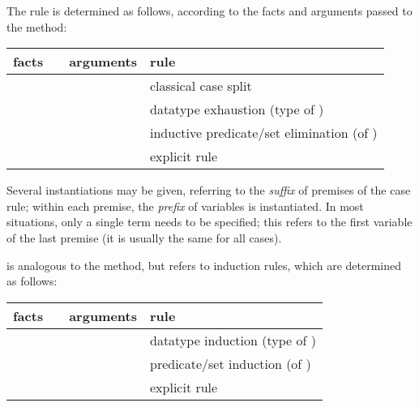\begin{isabellebody}
\begin{isamarkuptext}
\begin{descr}
  The rule is determined as follows, according to the facts and
  arguments passed to the \mbox{} method:

  \medskip
  \begin{tabular}{llll}
    facts           &                 & arguments   & rule \\\hline
                    & \mbox{\isa{cases}} &             & classical case split \\
                    & \mbox{\isa{cases}} & \isa{t}   & datatype exhaustion (type of \isa{t}) \\
    \isa{{\isachardoublequote}{\isasymturnstile}\ A\ t{\isachardoublequote}} & \mbox{\isa{cases}} & \isa{{\isachardoublequote}{\isasymdots}{\isachardoublequote}} & inductive predicate/set elimination (of \isa{A}) \\
    \isa{{\isachardoublequote}{\isasymdots}{\isachardoublequote}}     & \mbox{\isa{cases}} & \isa{{\isachardoublequote}{\isasymdots}\ rule{\isacharcolon}\ R{\isachardoublequote}} & explicit rule \isa{R} \\
  \end{tabular}
  \medskip

  Several instantiations may be given, referring to the \emph{suffix}
  of premises of the case rule; within each premise, the \emph{prefix}
  of variables is instantiated.  In most situations, only a single
  term needs to be specified; this refers to the first variable of the
  last premise (it is usually the same for all cases).

  \item [\mbox{\isa{induct}}~\isa{{\isachardoublequote}insts\ R{\isachardoublequote}}] is analogous to the
  \mbox{} method, but refers to induction rules, which are
  determined as follows:

  \medskip
  \begin{tabular}{llll}
    facts           &                  & arguments            & rule \\\hline
                    & \mbox{\isa{induct}} & \isa{{\isachardoublequote}P\ x{\isachardoublequote}}        & datatype induction (type of \isa{x}) \\
    \isa{{\isachardoublequote}{\isasymturnstile}\ A\ x{\isachardoublequote}} & \mbox{\isa{induct}} & \isa{{\isachardoublequote}{\isasymdots}{\isachardoublequote}}          & predicate/set induction (of \isa{A}) \\
    \isa{{\isachardoublequote}{\isasymdots}{\isachardoublequote}}     & \mbox{\isa{induct}} & \isa{{\isachardoublequote}{\isasymdots}\ rule{\isacharcolon}\ R{\isachardoublequote}} & explicit rule \isa{R} \\
  \end{tabular}
  \medskip
  

\end{descr}
\end{isamarkuptext}
\end{isabellebody}

